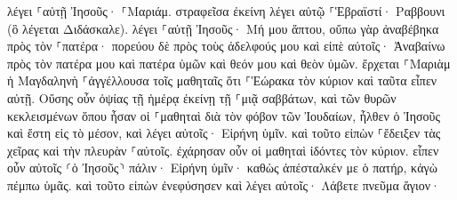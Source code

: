 \documentclass{openreader}
\begin{document}
λέγει ⸀αὐτῇ Ἰησοῦς· ⸀Μαριάμ. στραφεῖσα ἐκείνη λέγει αὐτῷ ⸀Ἑβραϊστί· Ραββουνι (ὃ λέγεται Διδάσκαλε). 
λέγει ⸀αὐτῇ Ἰησοῦς· Μή μου ἅπτου, οὔπω γὰρ ἀναβέβηκα πρὸς τὸν ⸀πατέρα· πορεύου δὲ πρὸς τοὺς ἀδελφούς μου καὶ εἰπὲ αὐτοῖς· Ἀναβαίνω πρὸς τὸν πατέρα μου καὶ πατέρα ὑμῶν καὶ θεόν μου καὶ θεὸν ὑμῶν. 
ἔρχεται ⸀Μαριὰμ ἡ Μαγδαληνὴ ⸀ἀγγέλλουσα τοῖς μαθηταῖς ὅτι ⸀Ἑώρακα τὸν κύριον καὶ ταῦτα εἶπεν αὐτῇ. 
Οὔσης οὖν ὀψίας τῇ ἡμέρᾳ ἐκείνῃ τῇ ⸀μιᾷ σαββάτων, καὶ τῶν θυρῶν κεκλεισμένων ὅπου ἦσαν οἱ ⸀μαθηταὶ διὰ τὸν φόβον τῶν Ἰουδαίων, ἦλθεν ὁ Ἰησοῦς καὶ ἔστη εἰς τὸ μέσον, καὶ λέγει αὐτοῖς· Εἰρήνη ὑμῖν. 
καὶ τοῦτο εἰπὼν ⸀ἔδειξεν τὰς χεῖρας καὶ τὴν πλευρὰν ⸀αὐτοῖς. ἐχάρησαν οὖν οἱ μαθηταὶ ἰδόντες τὸν κύριον. 
εἶπεν οὖν αὐτοῖς ⸂ὁ Ἰησοῦς⸃ πάλιν· Εἰρήνη ὑμῖν· καθὼς ἀπέσταλκέν με ὁ πατήρ, κἀγὼ πέμπω ὑμᾶς. 
καὶ τοῦτο εἰπὼν ἐνεφύσησεν καὶ λέγει αὐτοῖς· Λάβετε πνεῦμα ἅγιον· 
\end{document}
